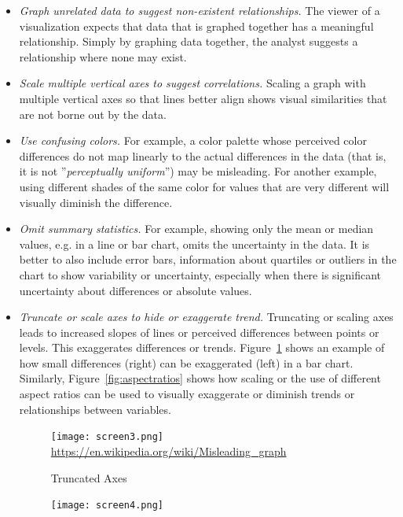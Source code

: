 \begin{itemize}
	\item \emph{Graph unrelated data to suggest non-existent relationships.} The viewer of a visualization expects that data that is graphed together has a meaningful relationship. Simply by graphing data together, the analyst suggests a relationship where none may exist.
	\item \emph{Scale multiple vertical axes to suggest correlations.} Scaling a graph with multiple vertical axes so that lines better align shows visual similarities that are not borne out by the data.
	\item \emph{Use confusing colors.} For example, a color palette whose perceived color differences do not map linearly to the actual differences in the data (that is, it is not ''\emph{perceptually uniform}'') may be misleading. For another example, using different shades of the same color for values that are very different will visually diminish the difference.
	\item \emph{Omit summary statistics.} For example, showing only the mean or median values, e.g. in a line or bar chart, omits the uncertainty in the data. It is better to also include error bars, information about quartiles or outliers in the chart to show variability or uncertainty, especially when there is significant uncertainty about differences or absolute values.
	\item \emph{Truncate or scale axes to hide or exaggerate trend.} Truncating or scaling axes leads to increased slopes of lines or perceived differences between points or levels. This exaggerates differences or trends. Figure~\ref{fig:truncated} shows an example of how small differences (right) can be exaggerated (left) in a bar chart. Similarly, Figure~\ref{fig:aspectratios} shows how scaling or the use of different aspect ratios can be used to visually exaggerate or diminish trends or relationships between variables.
\begin{figure}
\centering
\texttt{[image: screen3.png]} \\

\scriptsize\url{https://en.wikipedia.org/wiki/Misleading_graph}
\caption{Truncated Axes}
\label{fig:truncated}
\end{figure}
\begin{figure}
\centering
\texttt{[image: screen4.png]}


\end{figure}
\end{itemize}
